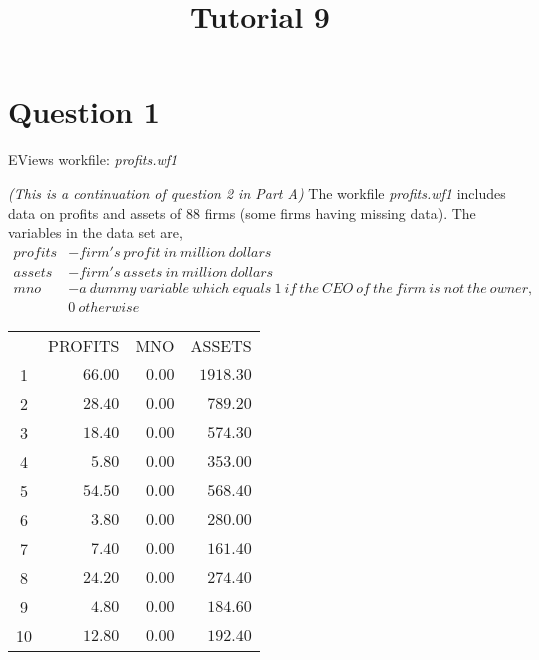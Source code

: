 \documentclass[12pt]{report}
\title{Tutorial 9}
\subtitle
{
\textbf{keywords}: variance, error, heteroskedasticity, homoskedasticity, residual plots, Breusch-Pagan test, White test, WLS

\textbf{estimated reading time}: 36 minutes
}
\begin{document}
\maketitle

\section*{Question 1}
\noindent EViews workfile: \textit{profits.wf1}

\noindent \textit{(This is a continuation of question 2 in Part A)} The workfile \textit{profits.wf1} includes data on profits and assets of 88 firms (some firms having missing data). The variables in the data set are,
\begin{align*}
profits &- firm's\ profit\ in\ million\ dollars \\
assets &- firm's\ assets\ in\ million\ dollars \\
mno &- a\ dummy\ variable\ which\ equals\ 1\ if\ the\ CEO\ of\ the\ firm\ is\ not\ the\ owner, \\ 
 &0\ otherwise 
\end{align*}
\vspace{-\baselineskip}
\begin{table}[!htbp]
	\centering
	\begin{tabular}{lrrr}
		\multicolumn{1}{c}{}&\multicolumn{1}{r}{PROFITS}&\multicolumn{1}{r}{MNO}&\multicolumn{1}{r}{ASSETS}\\
		\multicolumn{1}{c}{1}&\multicolumn{1}{r}{$66.00$}&\multicolumn{1}{r}{$0.00$}&\multicolumn{1}{r}{$1918.30$}\\
		\multicolumn{1}{c}{2}&\multicolumn{1}{r}{$28.40$}&\multicolumn{1}{r}{$0.00$}&\multicolumn{1}{r}{$789.20$}\\
		\multicolumn{1}{c}{3}&\multicolumn{1}{r}{$18.40$}&\multicolumn{1}{r}{$0.00$}&\multicolumn{1}{r}{$574.30$}\\
		\multicolumn{1}{c}{4}&\multicolumn{1}{r}{$5.80$}&\multicolumn{1}{r}{$0.00$}&\multicolumn{1}{r}{$353.00$}\\
		\multicolumn{1}{c}{5}&\multicolumn{1}{r}{$54.50$}&\multicolumn{1}{r}{$0.00$}&\multicolumn{1}{r}{$568.40$}\\
		\multicolumn{1}{c}{6}&\multicolumn{1}{r}{$3.80$}&\multicolumn{1}{r}{$0.00$}&\multicolumn{1}{r}{$280.00$}\\
		\multicolumn{1}{c}{7}&\multicolumn{1}{r}{$7.40$}&\multicolumn{1}{r}{$0.00$}&\multicolumn{1}{r}{$161.40$}\\
		\multicolumn{1}{c}{8}&\multicolumn{1}{r}{$24.20$}&\multicolumn{1}{r}{$0.00$}&\multicolumn{1}{r}{$274.40$}\\
		\multicolumn{1}{c}{9}&\multicolumn{1}{r}{$4.80$}&\multicolumn{1}{r}{$0.00$}&\multicolumn{1}{r}{$184.60$}\\
		\multicolumn{1}{c}{10}&\multicolumn{1}{r}{$12.80$}&\multicolumn{1}{r}{$0.00$}&\multicolumn{1}{r}{$192.40$}\\
	\end{tabular}
\end{table}
\end{document}
